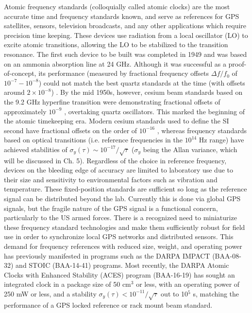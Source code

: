 Atomic frequency standards (colloquially called atomic clocks) are the most accurate time and frequency standards known, and serve as references for GPS satellites, sensors, television broadcasts, and any other applications which require precision time keeping. These devices use radiation from a local oscillator (LO) to excite atomic transitions, allowing the LO to be stabilized to the transition resonance. The first such device to be built was completed in 1949 and was based on an ammonia absorption line at 24 GHz. Although it was successful as a proof-of-concept, its performance (measured by fractional frequency offsets $\Delta f / f_0$ of $10^{-7} - 10^{-8}$) could not match the best quartz standards at the time (with offsets around $2 \times 10^{-8}$) \cite{nistclocks, ammoniaclock}. By the mid 1950s, however, cesium beam standards based on the 9.2 GHz hyperfine transition were demonstrating fractional offsets of approximately $10^{-9}$ \cite{firstCs}, overtaking quartz oscillators. This marked the beginning of the atomic timekeeping era. Modern cesium standards used to define the SI second have fractional offsets on the order of $10^{-16}$ \cite{nistf2}, whereas frequency standards based on optical transitions (i.e. reference frequencies in the $10^{14}$ Hz range) have achieved stabilities of $\sigma_y (\tau) \sim 10^{-17} / \sqrt{\tau}$ \cite{OpticalClocks} ($\sigma_y$ being the Allan variance, which will be discussed in Ch. 5). Regardless of the choice in reference frequency,  devices on the bleeding edge of accuracy are limited to laboratory use due to their size and sensitivity to environmental factors such as vibration and temperature. These fixed-position standards are sufficient so long as the reference signal can be distributed beyond the lab. Currently this is done via global GPS signals, but the fragile nature of the GPS signal is a functional concern, particularly to the US armed forces. There is a recognized need to miniaturize these frequency standard technologies and make them sufficiently robust for field use in order to synchronize local GPS networks and distributed sensors. This demand for frequency references with reduced size, weight, and operating power has previously manifested in programs such as the DARPA IMPACT (BAA-08-32) and STOIC (BAA-14-41) programs. Most recently, the DARPA Atomic Clocks with Enhanced Stability (ACES) program (BAA-16-19) has sought an integrated clock in a package size of 50 cm$^3$ or less, with an operating power of 250 mW or less, and a stability $\sigma_y (\tau) < 10^{-11} / \sqrt{\tau}$ out to 10$^5$ s, matching the performance of a GPS locked reference or rack mount beam standard.


